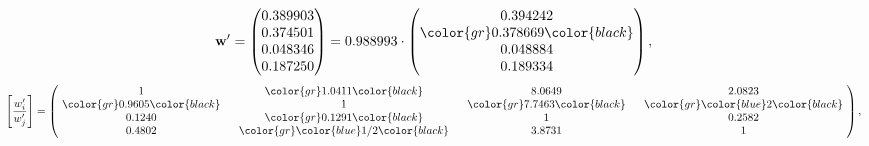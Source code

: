 \begin{example}
\begin{equation*}
\mathbf{w}^{\prime} =
\begin{pmatrix}
0.389903\\
0.374501\\
0.048346\\
0.187250
\end{pmatrix} =
0.988993\cdot
\begin{pmatrix}
0.394242\\
\color{gr} 0.378669\color{black} \\
0.048884\\
0.189334
\end{pmatrix},
\end{equation*}
\begin{equation*}
\left[ \frac{{w}^{\prime}_i}{{w}^{\prime}_j} \right] =
\begin{pmatrix}
$\,\,$ 1 $\,\,$ & $\,\,$\color{gr} 1.0411\color{black} $\,\,$ & $\,\,$8.0649$\,\,$ & $\,\,$2.0823$\,\,$ \\
$\,\,$\color{gr} 0.9605\color{black} $\,\,$ & $\,\,$ 1 $\,\,$ & $\,\,$\color{gr} 7.7463\color{black} $\,\,$ & $\,\,$\color{gr} \color{blue} 2\color{black}   $\,\,$ \\
$\,\,$0.1240$\,\,$ & $\,\,$\color{gr} 0.1291\color{black} $\,\,$ & $\,\,$ 1 $\,\,$ & $\,\,$0.2582 $\,\,$ \\
$\,\,$0.4802$\,\,$ & $\,\,$\color{gr} \color{blue}  1/2\color{black} $\,\,$ & $\,\,$3.8731$\,\,$ & $\,\,$ 1  $\,\,$ \\
\end{pmatrix},
\end{equation*}
\end{example}
\newpage
